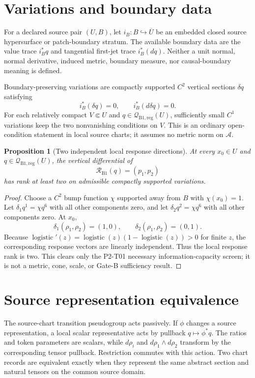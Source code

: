 \documentclass[11pt]{article}
\newtheorem{proposition}{Proposition}
\newcommand{\A}{\mathcal A}
\newcommand{\Qreg}{\mathcal Q_{\mathrm{B1,reg}}}
\newcommand{\R}{\mathcal R_{\mathrm{B1}}}
\newcommand{\sigm}{\operatorname{logistic}}
\begin{document}
\section{Variations and boundary data}

For a declared source pair $(U,B)$, let $i_B:B\hookrightarrow\overline U$ be
an embedded closed source hypersurface or patch-boundary stratum.  The
available boundary data are the value trace $i_B^*q$ and tangential first-jet
trace $i_B^*(dq)$.  Neither a unit normal, normal derivative, induced metric,
boundary measure, nor causal-boundary meaning is defined.

Boundary-preserving variations are compactly supported $C^2$ vertical
sections $\delta q$ satisfying
\[
 i_B^*(\delta q)=0,\qquad i_B^*(d\delta q)=0.
\]
For each relatively compact $V\Subset U$ and $q\in\Qreg(U)$,
sufficiently small $C^1$ variations keep the two nonvanishing conditions on
$V$.  This is an ordinary open-condition statement in local source charts;
it assumes no metric norm on $\A$.

\begin{proposition}[Two independent local response directions]
At every $x_0\in U$ and $q\in\Qreg(U)$, the vertical differential of
\[
 \R(q)=(p_1,p_2)
\]
has rank at least two on admissible compactly supported variations.
\end{proposition}
\begin{proof}
Choose a $C^2$ bump function $\chi$ supported away from $B$ with
$\chi(x_0)=1$.  Let $\delta_1q^1=\chi q^6$ with all other components zero,
and let $\delta_2q^2=\chi q^6$ with all other components zero.  At $x_0$,
\[
 \delta_1(\rho_1,\rho_2)=(1,0),\qquad
 \delta_2(\rho_1,\rho_2)=(0,1).
\]
Because $\sigm'(z)=\sigm(z)(1-\sigm(z))>0$ for finite $z$, the corresponding
response vectors are linearly independent.  Thus the local response rank is
two.  This clears only the P2-T01 necessary information-capacity screen; it is
not a metric, cone, scale, or Gate-B sufficiency result.
\end{proof}

\section{Source representation equivalence}

The source-chart transition pseudogroup acts passively.  If $\phi$ changes a
source representation, a local scalar representative acts by pullback
$q\mapsto\phi^*q$.  The ratios and token parameters are scalars, while
$d\rho_i$ and $d\rho_1\wedge d\rho_2$ transform by the corresponding tensor
pullback.  Restriction commutes with this action.  Two chart records are
equivalent exactly when they represent the same abstract section and natural
tensors on the common source domain.
\end{document}
